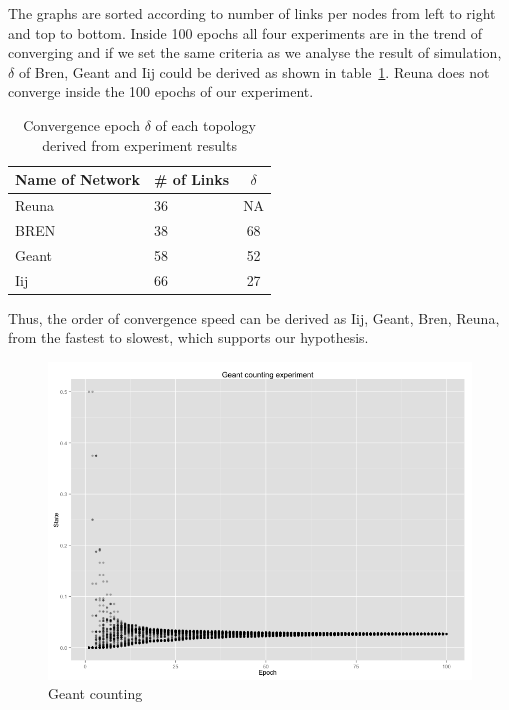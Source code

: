 The graphs are sorted according to number of links per nodes from left to right and top to bottom. Inside 100 epochs all four experiments are in the trend of converging and if we set the same criteria as we analyse the result of simulation, $\delta$ of Bren, Geant and Iij could be derived as shown in table~\ref{table:exp}. Reuna does not converge inside the 100 epochs of our experiment.
\begin{table}
\centering
\caption{Convergence epoch $\delta$ of each topology derived from experiment results}
\begin{tabular}{llc}
	\hline
	Name of Network &  \# of Links & $\delta$ \\
    	\hline
    	Reuna & 36 & NA\\
    	BREN & 38 & 68\\
    	Geant & 58 & 52\\
    	Iij & 66 & 27\\
    	\hline
\end{tabular}
\label{table:exp}
\end{table}

Thus, the order of convergence speed can be derived as Iij, Geant, Bren, Reuna, from the fastest to slowest, which supports our hypothesis.

\begin{figure}[h!]
    \begin{center}
    \includegraphics[scale=0.4]{figures/geant_counting_exp.png}
    \end{center}
    \caption{Geant counting}
    \label{fig:geant}
\end{figure}
\label{sec:results}
